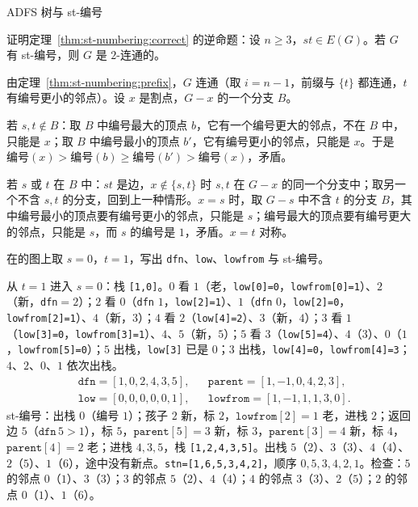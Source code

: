 \begin{exercises}{A}{DFS 树与 st-编号}
\item\label{ex:st-numbering:A1} 证明定理~\ref{thm:st-numbering:correct} 的逆命题：设 $n\geqslant3$，$st\in E(G)$。若 $G$ 有 st-编号，则 $G$ 是 $2$-连通的。
\begin{solution}
由定理~\ref{thm:st-numbering:prefix}，$G$ 连通（取 $i=n-1$，前缀与 $\{t\}$ 都连通，$t$ 有编号更小的邻点）。设 $x$ 是割点，$G-x$ 的一个分支 $B$。

若 $s,t\notin B$：取 $B$ 中编号最大的顶点 $b$，它有一个编号更大的邻点，不在 $B$ 中，只能是 $x$；取 $B$ 中编号最小的顶点 $b'$，它有编号更小的邻点，只能是 $x$。于是 $\text{编号}(x)>\text{编号}(b)\geqslant\text{编号}(b')>\text{编号}(x)$，矛盾。

若 $s$ 或 $t$ 在 $B$ 中：$st$ 是边，$x\notin\{s,t\}$ 时 $s,t$ 在 $G-x$ 的同一个分支中；取另一个不含 $s,t$ 的分支，回到上一种情形。$x=s$ 时，取 $G-s$ 中不含 $t$ 的分支 $B$，其中编号最小的顶点要有编号更小的邻点，只能是 $s$；编号最大的顶点要有编号更大的邻点，只能是 $s$，而 $s$ 的编号是 $1$，矛盾。$x=t$ 对称。
\end{solution}

\item\label{ex:st-numbering:A2} 在的图上取 $s=0$，$t=1$，写出 \texttt{dfn}、\texttt{low}、\texttt{lowfrom} 与 st-编号。
\begin{solution}
从 $t=1$ 进入 $s=0$：栈 \texttt{[1,0]}。$0$ 看 $1$（老，\texttt{low[0]=0}，\texttt{lowfrom[0]=1}）、$2$（新，\texttt{dfn}$=2$）；$2$ 看 $0$（\texttt{dfn} $1$，\texttt{low[2]=1}）、$1$（\texttt{dfn} $0$，\texttt{low[2]=0}，\texttt{lowfrom[2]=1}）、$4$（新，$3$）；$4$ 看 $2$（\texttt{low[4]=2}）、$3$（新，$4$）；$3$ 看 $1$（\texttt{low[3]=0}，\texttt{lowfrom[3]=1}）、$4$、$5$（新，$5$）；$5$ 看 $3$（\texttt{low[5]=4}）、$4$（$3$）、$0$（$1$，\texttt{lowfrom[5]=0}）；$5$ 出栈，\texttt{low[3]} 已是 $0$；$3$ 出栈，\texttt{low[4]=0}，\texttt{lowfrom[4]=3}；$4$、$2$、$0$、$1$ 依次出栈。
\[
\begin{aligned}
&\texttt{dfn}=[1,0,2,4,3,5],&&\texttt{parent}=[1,-1,0,4,2,3],\\
&\texttt{low}=[0,0,0,0,0,1],&&\texttt{lowfrom}=[1,-1,1,1,3,0].
\end{aligned}
\]
st-编号：出栈 $0$（编号 $1$）；孩子 $2$ 新，标 $2$，$\texttt{lowfrom}[2]=1$ 老，进栈 $2$；返回边 $5$（$\texttt{dfn}\,5>1$），标 $5$，$\texttt{parent}[5]=3$ 新，标 $3$，$\texttt{parent}[3]=4$ 新，标 $4$，$\texttt{parent}[4]=2$ 老；进栈 $4,3,5$，栈 \texttt{[1,2,4,3,5]}。出栈 $5$（$2$）、$3$（$3$）、$4$（$4$）、$2$（$5$）、$1$（$6$），途中没有新点。\texttt{stn=[1,6,5,3,4,2]}，顺序 $0,5,3,4,2,1$。检查：$5$ 的邻点 $0$（$1$）、$3$（$3$）；$3$ 的邻点 $5$（$2$）、$4$（$4$）；$4$ 的邻点 $3$（$3$）、$2$（$5$）；$2$ 的邻点 $0$（$1$）、$1$（$6$）。
\end{solution}


\end{exercises}
